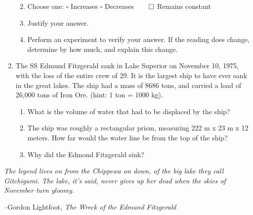 \documentclass[letterpaper, 11pt]{article}
\begin{document}
\begin{enumerate}
	\begin{enumerate} 
		\vspace{-.1in}
	 \item Choose one: \hspace{.25in}
	 $ \square $ Increases \hspace{.25in} $ \square $ Decreases $ \hspace{.25in} \square$ Remains constant
	 
	 \item Justify your answer.
	 \vspace{.4in}
	 \item Perform an experiment to verify your answer.  If the reading does change, determine by how much, and explain this change. 
	 \vspace{.45in}
	 
	  \end{enumerate}
  
	\item The SS Edmund Fitzgerald  sank in Lake Superior on November 10, 1975, with the loss of the entire crew of 29. It is the largest ship to have ever sank in the great lakes.  The ship had a mass of 8686 tons, and carried a load of 26,000 tons of Iron Ore.  (hint: 1 ton = 1000 kg). 
	\begin{enumerate}
		\item   What is the volume of water that had to be displaced by the ship?
		\vspace{.4in}
		\item The ship was roughly a rectangular prism, measuring 222 m x 23 m x 12 meters.  How far would the water line be from the top of the ship?
		\vspace{0.4in}
		\item Why did the Edmond Fitzgerald sink?
		\vspace{0.4in}
		
	\end{enumerate}
	 
	 

\end{enumerate}

 

 
 
 \begin{center}
 	
 	\textit{
 			 The legend lives on from the Chippewa on down, of the big lake they call Gitchigumi.
 		The lake, it's said, never gives up her dead when the skies of November turn gloomy.}
 		
 		--Gordon Lightfoot, \textit {The Wreck of the Edmund Fitzgerald}
 
 	  
 \end{center}

 
	
\end{document}
